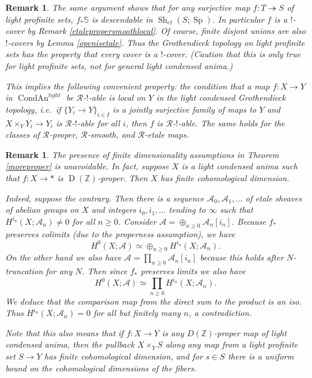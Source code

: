 \documentclass[12pt]{article}
\newtheorem{remark}[theorem]{Remark}
\newcommand{\on}{\operatorname}
\newcommand{\mc}{\mathcal}
\newcommand{\mbb}{\mathbb}
\begin{document}
\begin{remark}\label{trulylocal}
The same argument shows that for any surjective map $f:T\twoheadrightarrow S$ of light profinite sets, $f_\ast\mbb{S}$ is descendable in $\on{Sh}_{et}(S;\on{Sp})$.  In particular $f$ is a $!$-cover by Remark \ref{etalepropersmoothlocal}.  Of course, finite disjont unions are also $!$-covers by Lemma \ref{openisetale}.  Thus the Grothendieck topology on light profinite sets has the property that every cover is a $!$-cover.  (Caution that this is only true for light profinite sets, not for general light condensed anima.)

 This implies the following convenient property: the condition that a map $f:X\to Y$ in $\on{CondAn}^{light}$ be $\mc{R}$-$!$-able is local on $Y$ in the light condensed Grothendieck topology, i.e.\ if $\{Y_i\to Y\}_{i\in I}$ is a jointly surjective family of maps to $Y$ and $X\times_Y Y_i\to Y_i$ is $\mc{R}$-$!$-able for all $i$, then $f$ is $\mc{R}$-$!$-able.  The same holds for the classes of $\mc{R}$-proper, $\mc{R}$-smooth, and $\mc{R}$-etale maps.
\end{remark}

\begin{remark}
The presence of finite dimensionality assumptions in Theorem \ref{moreproper} is unavoidable.  In fact, suppose $X$ is a light condensed anima such that $f:X\to \ast$ is $\on{D}(\mbb{Z})$-proper.  Then $X$ has finite cohomological dimension.

Indeed, suppose the contrary.  Then there is a sequence $\mathcal{A}_0,\mathcal{A}_1,\ldots$ of etale sheaves of abelian groups on $X$ and integers $i_0,i_1,\ldots$ tending to $\infty$ such that $H^{i_n}(X;\mathcal{A}_n)\neq 0$ for all $n\geq 0$.  Consider $\mathcal{A} = \oplus_{n\geq 0} \mathcal{A}_n[i_n]$.  Because $f_\ast$ preserves colimits (due to the properness assumption), we have
$$H^0(X;\mathcal{A}) \simeq \oplus_{n\geq 0} H^{i_n}(X;\mathcal{A}_n).$$
On the other hand we also have $\mathcal{A} = \prod_{n\geq 0} \mathcal{A}_n[i_n]$ because this holds after $N$-truncation for any $N$.  Then since $f_\ast$ preserves limits we also have
$$H^0(X;\mathcal{A})\simeq \prod_{n\geq 0} H^{i_n}(X;\mathcal{A}_n).$$
We deduce that the comparison map from the direct sum to the product is an iso.  Thus $H^{i_n}(X;\mathcal{A}_n)=0$ for all but finitely many $n$, a contradiction.

Note that this also means that if $f:X\to Y$ is any $D(\mbb{Z})$-proper map of light condensed anima, then the pullback $X\times_Y S$ along any map from a light profinite set $S\to Y$ has finite cohomological dimension, and for $s\in S$ there is a uniform bound on the cohomological dimensions of the fibers.
\end{remark}
\end{document}
